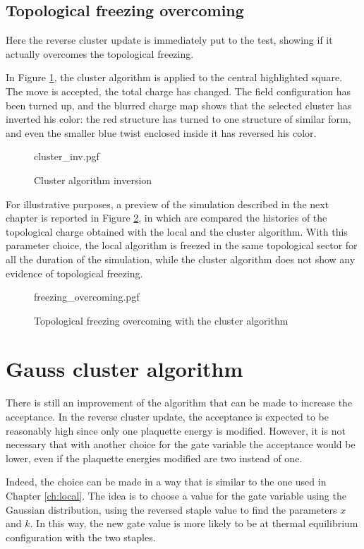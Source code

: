\subsection*{Topological freezing overcoming}
Here the reverse cluster update is immediately put to the test,
showing if it actually overcomes the topological freezing.

In Figure \ref{fig:cluster_inv}, the cluster algorithm is applied to the central highlighted square.
The move is accepted, the total charge has changed.
The field configuration has been turned up,
and the blurred charge map shows that the selected cluster has inverted his color:
the red structure has turned to one structure of similar form,
and even the smaller blue twist enclosed inside it has reversed his color.

\begin{figure}[!htb]
    \centering
    {cluster_inv.pgf}
    \caption{Cluster algorithm inversion}
    \label{fig:cluster_inv}
\end{figure}

For illustrative purposes,
a preview of the simulation described in the next chapter is reported in Figure \ref{fig:freezing_overcoming},
in which are compared the histories of the topological charge obtained with the local and the cluster algorithm.
With this parameter choice, the local algorithm is freezed in the same topological sector for all the duration of the simulation,
while the cluster algorithm does not show any evidence of topological freezing.

\begin{figure}[!htb]
    \centering
    {freezing_overcoming.pgf}
    \caption{Topological freezing overcoming with the cluster algorithm}
    \label{fig:freezing_overcoming}
\end{figure}

\section{Gauss cluster algorithm}

There is still an improvement of the algorithm that can be made to increase the acceptance.
In the reverse cluster update,
the acceptance is expected to be reasonably high since only one plaquette energy is modified.
However, it is not necessary that with another choice for the gate variable the acceptance would be lower,
even if the plaquette energies modified are two instead of one.

Indeed, the choice can be made in a way that is similar to the one used in Chapter \ref{ch:local}.
The idea is to choose a value for the gate variable using the Gaussian distribution,
using the reversed staple value to find the parameters $x$ and $k$.
In this way, the new gate value is more likely to be at thermal equilibrium configuration with the two staples.

